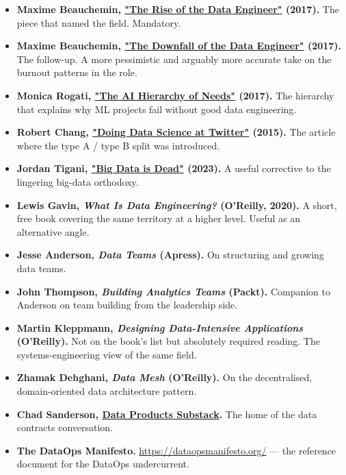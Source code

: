 \begin{itemize}[leftmargin=*]
  \item \textbf{Maxime Beauchemin, \href{https://www.freecodecamp.org/news/the-rise-of-the-data-engineer-91be18f1e603/}{"The Rise of the Data Engineer"} (2017).} The piece that named the field. Mandatory.
  \item \textbf{Maxime Beauchemin, \href{https://maximebeauchemin.medium.com/the-downfall-of-the-data-engineer-5bfb701e5d6b}{"The Downfall of the Data Engineer"} (2017).} The follow-up. A more pessimistic and arguably more accurate take on the burnout patterns in the role.
  \item \textbf{Monica Rogati, \href{https://hackernoon.com/the-ai-hierarchy-of-needs-18f111fcc007}{"The AI Hierarchy of Needs"} (2017).} The hierarchy that explains why ML projects fail without good data engineering.
  \item \textbf{Robert Chang, \href{https://medium.com/@RobertChang/doing-data-science-at-twitter-49ac2bf0edae}{"Doing Data Science at Twitter"} (2015).} The article where the type A / type B split was introduced.
  \item \textbf{Jordan Tigani, \href{https://motherduck.com/blog/big-data-is-dead/}{"Big Data is Dead"} (2023).} A useful corrective to the lingering big-data orthodoxy.
  \item \textbf{Lewis Gavin, \emph{What Is Data Engineering?} (O'Reilly, 2020).} A short, free book covering the same territory at a higher level. Useful as an alternative angle.
  \item \textbf{Jesse Anderson, \emph{Data Teams} (Apress).} On structuring and growing data teams.
  \item \textbf{John Thompson, \emph{Building Analytics Teams} (Packt).} Companion to Anderson on team building from the leadership side.
  \item \textbf{Martin Kleppmann, \emph{Designing Data-Intensive Applications} (O'Reilly).} Not on the book's list but absolutely required reading. The systems-engineering view of the same field.
  \item \textbf{Zhamak Dehghani, \emph{Data Mesh} (O'Reilly).} On the decentralised, domain-oriented data architecture pattern.
  \item \textbf{Chad Sanderson, \href{https://dataproducts.substack.com/}{Data Products Substack}.} The home of the data contracts conversation.
  \item \textbf{The DataOps Manifesto.} \url{https://dataopsmanifesto.org/} — the reference document for the DataOps undercurrent.
\end{itemize}

